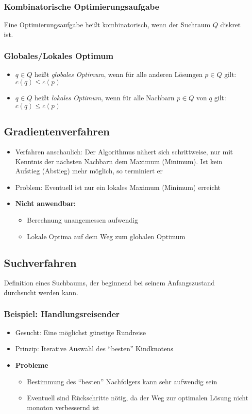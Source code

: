 \subsubsection{Kombinatorische Optimierungsaufgabe}
Eine Optimierungsaufgabe heißt kombinatorisch, wenn der Suchraum \(Q\) diskret ist.

\subsubsection{Globales/Lokales Optimum}
\begin{itemize}
	\item \(q \in Q\) heißt \textit{globales Optimum}, wenn für alle anderen Lösungen \(p \in Q\) gilt: \(c(q) \leq c(p)\)
	\item \(q \in Q\) heißt \textit{lokales Optimum}, wenn für alle Nachbarn \(p \in Q\) von \(q\) gilt: \(c(q) \leq c(p)\)
\end{itemize}


\subsection{Gradientenverfahren}
\begin{itemize}
	\item Verfahren anschaulich: Der Algorithmus nähert sich schrittweise, nur mit Kenntnis der nächsten Nachbarn dem Maximum (Minimum). Ist kein Aufstieg (Abstieg) mehr möglich, so terminiert er
	\item Problem: Eventuell ist nur ein lokales Maximum (Minimum) erreicht
	\item \textbf{Nicht anwendbar:}
	\begin{itemize}
		\item Berechnung unangemessen aufwendig
		\item Lokale Optima auf dem Weg zum globalen Optimum
	\end{itemize}
\end{itemize}


\subsection{Suchverfahren}
Definition eines Suchbaums, der beginnend bei seinem Anfangszustand durchsucht werden kann.

\subsubsection{Beispiel: Handlungsreisender}
\begin{itemize}
	\item Gesucht: Eine möglichst günstige Rundreise
	\item Prinzip: Iterative Auswahl des "`besten"' Kindknotens
	\item \textbf{Probleme}
	\begin{itemize}
		\item Bestimmung des "`besten"' Nachfolgers kann sehr aufwendig sein
		\item Eventuell sind Rückschritte nötig, da der Weg zur optimalen Lösung nicht monoton verbessernd ist
	\end{itemize}
\end{itemize}


